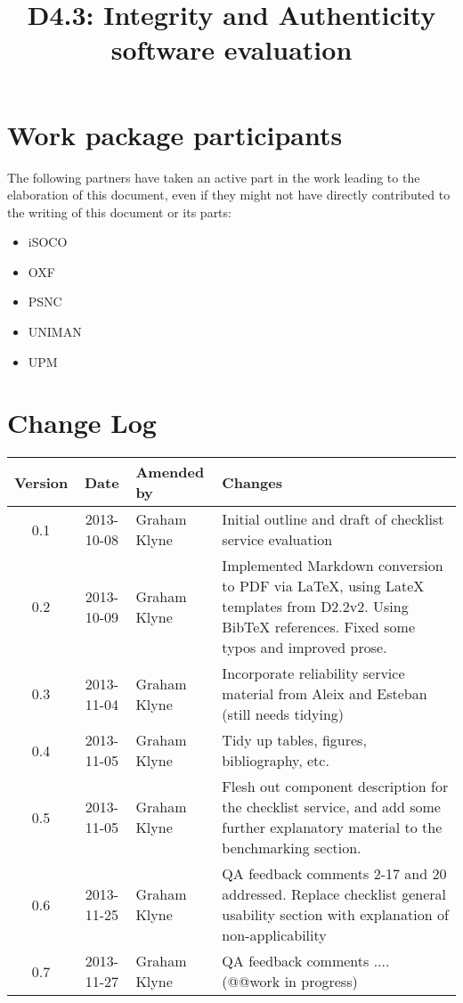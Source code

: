\documentclass[a4paper, twoside, 11pt]{article}
\title{D4.3: Integrity and Authenticity software evaluation}
\begin{document}
\maketitle

\section*{Work package participants} The following partners have taken an active part in the work leading to the elaboration of this document, even if they might not have directly contributed to the writing of this document or its parts: %
\begin{itemize}
\item iSOCO
\item OXF
\item PSNC
\item UNIMAN
\item UPM
\end{itemize}

\section*{Change Log}
\begin{centering}

\begin{tabular}{|c|c|p{4.92cm}|p{6.5cm}|}

\hline \textbf{Version} & \textbf{Date} & \textbf{Amended by} & \textbf{Changes} \\ \hline
0.1 & 2013-10-08 & Graham Klyne & Initial outline and draft of checklist service evaluation \\ \hline
0.2 & 2013-10-09 & Graham Klyne & Implemented Markdown conversion to PDF via LaTeX, using LateX templates from D2.2v2.  Using BibTeX references.  Fixed some typos and improved prose. \\ \hline
0.3 & 2013-11-04 & Graham Klyne & Incorporate reliability service material from Aleix and Esteban (still needs tidying) \\ \hline
0.4 & 2013-11-05 & Graham Klyne & Tidy up tables, figures, bibliography, etc. \\ \hline
0.5 & 2013-11-05 & Graham Klyne & Flesh out component description for the checklist service, and add some further explanatory material to the benchmarking section. \\ \hline
0.6 & 2013-11-25 & Graham Klyne & QA feedback comments 2-17 and 20 addressed.
Replace checklist general usability section with explanation of non-applicability
\\ \hline
0.7 & 2013-11-27 & Graham Klyne & QA feedback comments .... (@@work in progress)
\\ \hline



\end{tabular}

\end{centering}
\clearpage
\end{document}
